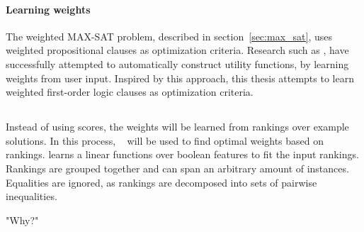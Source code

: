 \paragraph{Learning weights}
The weighted MAX-SAT problem, described in section~\ref{sec:max_sat}, uses weighted propositional clauses as optimization criteria.
Research such as \cite{campigotto2011active}, have successfully attempted to  automatically construct utility functions, by learning weights from user input.
Inspired by this approach, this thesis attempts to learn weighted first-order logic clauses as optimization criteria.

\subsection{\svm}
Instead of using scores, the weights will be learned from rankings over example solutions.
In this process, \svm \  \cite{joachims2002optimizing} will be used to find optimal weights based on rankings.
\svm learns a linear functions over boolean features to fit the input rankings.
Rankings are grouped together and can span an arbitrary amount of instances.
Equalities are ignored, as rankings are decomposed into sets of pairwise inequalities.

"Why?"